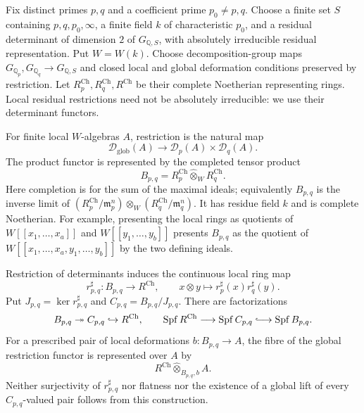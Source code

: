Fix distinct primes $p,q$ and a coefficient prime $p_0\ne p,q$.
Choose a finite set $S$ containing $p,q,p_0,\infty$, a finite field
$k$ of characteristic $p_0$, and a residual determinant of dimension
$2$ of $G_{\mathbb Q,S}$, with absolutely irreducible residual
representation. Put $W=W(k)$. Choose decomposition-group maps
$G_{\mathbb Q_p},G_{\mathbb Q_q}\to G_{\mathbb Q,S}$ and closed local
and global deformation conditions preserved by restriction.
Let $R_p^{\mathrm{Ch}},R_q^{\mathrm{Ch}},R^{\mathrm{Ch}}$ be their
complete Noetherian representing rings. Local residual restrictions
need not be absolutely irreducible: we use their determinant functors.

For finite local $W$-algebras $A$, restriction is the natural map
\[
 \mathcal D_{\mathrm{glob}}(A)\longrightarrow
 \mathcal D_p(A)\times\mathcal D_q(A).
\]
The product functor is represented by the completed tensor product
\[
 B_{p,q}=R_p^{\mathrm{Ch}}\widehat\otimes_W R_q^{\mathrm{Ch}}.
\]
Here completion is for the sum of the maximal ideals; equivalently
$B_{p,q}$ is the inverse limit of
$(R_p^{\mathrm{Ch}}/\mathfrak m_p^n)\otimes_W
 (R_q^{\mathrm{Ch}}/\mathfrak m_q^n)$.
It has residue field $k$ and is complete Noetherian. For example,
presenting the local rings as quotients of $W[[x_1,\ldots,x_a]]$
and $W[[y_1,\ldots,y_b]]$ presents $B_{p,q}$ as the quotient of
$W[[x_1,\ldots,x_a,y_1,\ldots,y_b]]$ by the two defining ideals.

\begin{theorem}
\label{v4-arith:w5-h:thm:ch1-closure}
\ClaimStatusProvedHere
Restriction of determinants induces the continuous local ring map
\begin{equation}
\label{v4-arith:w5-h:eq:chenevier-restriction}
 r_{p,q}^{\sharp}:B_{p,q}\longrightarrow R^{\mathrm{Ch}},
 \qquad x\otimes y\longmapsto r_p^{\sharp}(x)r_q^{\sharp}(y).
\end{equation}
Put $J_{p,q}=\ker r_{p,q}^{\sharp}$ and
$C_{p,q}=B_{p,q}/J_{p,q}$. There are factorizations
\[
 B_{p,q}\twoheadrightarrow C_{p,q}\hookrightarrow R^{\mathrm{Ch}},
 \qquad
 \operatorname{Spf}R^{\mathrm{Ch}}
 \longrightarrow\operatorname{Spf}C_{p,q}
 \lhook\joinrel\longrightarrow\operatorname{Spf}B_{p,q}.
\]
For a prescribed pair of local deformations $b:B_{p,q}\to A$,
the fibre of the global restriction functor is represented over $A$
by
\[
 R^{\mathrm{Ch}}\widehat\otimes_{B_{p,q},b} A.
\]
Neither surjectivity of $r_{p,q}^{\sharp}$ nor flatness nor the
existence of a global lift of every $C_{p,q}$-valued pair follows
from this construction.
\end{theorem}

